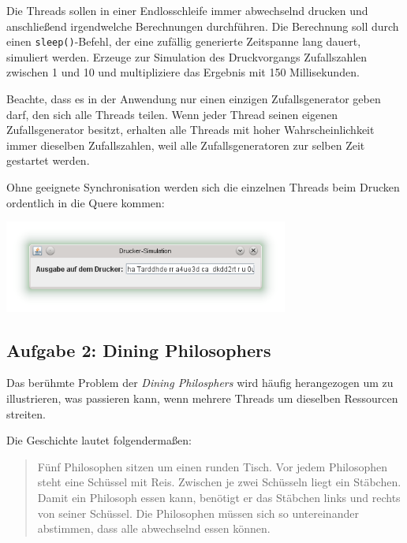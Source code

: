 Die Threads sollen in einer Endlosschleife immer abwechselnd drucken und
anschließend irgendwelche Berechnungen durchführen. Die Berechnung
soll durch einen \lstinline|sleep()|-Befehl, der eine
zufällig generierte Zeitspanne lang dauert, simuliert werden.
Erzeuge zur Simulation des Druckvorgangs Zufallszahlen zwischen 1 und 10  und
multipliziere das Ergebnis mit 150 Millisekunden.

Beachte, dass es in der Anwendung nur einen einzigen Zufallsgenerator geben
darf, den sich alle Threads teilen. Wenn jeder Thread seinen eigenen
Zufallsgenerator besitzt, erhalten alle Threads mit hoher Wahrscheinlichkeit
immer dieselben Zufallszahlen, weil alle Zufallsgeneratoren zur selben Zeit
gestartet werden.

Ohne geeignete Synchronisation werden sich die einzelnen Threads beim Drucken
ordentlich in die Quere kommen:

\begin{center}
\includegraphics[width=0.7\textwidth]{./inf/SEKII/26_Java_Threads/Drucker-Simulation_nicht-synchronisiert.png}
\end{center}


\subsection{Aufgabe 2: Dining Philosophers}

Das berühmte Problem der {\em Dining Philosphers} wird häufig herangezogen um zu
illustrieren, was passieren kann, wenn mehrere Threads um dieselben Ressourcen
streiten.

\pagebreak

Die Geschichte lautet folgendermaßen:

\begin{quotation}
\noindent Fünf Philosophen sitzen um einen runden Tisch. Vor jedem Philosophen
steht eine Schüssel mit Reis. Zwischen je zwei Schüsseln liegt ein Stäbchen.
Damit ein Philosoph essen kann, benötigt er das Stäbchen links und rechts von
seiner Schüssel. Die Philosophen müssen sich so untereinander abstimmen, dass
alle abwechselnd essen können.
\end{quotation}


